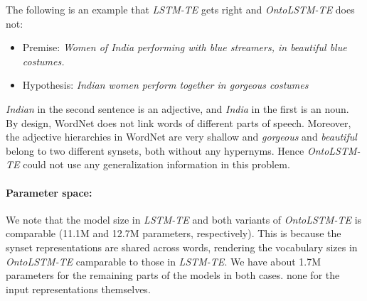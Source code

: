The following is an example that \textit{LSTM-TE} gets right and \textit{OntoLSTM-TE} does not:
\begin{itemize}
 \item Premise: \textit{Women of India performing with blue streamers, in 
beautiful blue costumes.}
 \item Hypothesis: \textit{Indian women perform together in gorgeous costumes}
\end{itemize}
\textit{Indian} in the second sentence is an adjective, and \textit{India} in 
the first is an noun. By design, WordNet does not link words of different parts 
of speech. Moreover, the adjective hierarchies in WordNet are very shallow and 
\textit{gorgeous} and \textit{beautiful} belong to two different synsets, both 
without any hypernyms. Hence \textit{OntoLSTM-TE} could not use any generalization 
information in this problem.

\paragraph{Parameter space:} We note that the model size in \textit{LSTM-TE} and both 
variants of \textit{OntoLSTM-TE} is comparable (11.1M and 12.7M parameters, respectively). 
This is because the synset representations are shared across words, rendering 
the vocabulary sizes in \textit{OntoLSTM-TE} camparable to those in \textit{LSTM-TE}. We have about 1.7M 
parameters for the remaining parts of the models in both cases. 
none for the input representations themselves.

